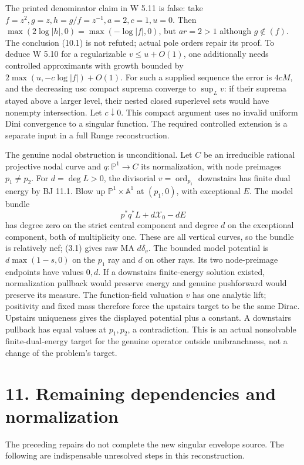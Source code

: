 \documentclass[
  10pt,
]{article}
\begin{document}
The printed denominator claim in W 5.11 is false: take
\(f=z^2,g=z,h=g/f=z^{-1},a=2,c=1,u=0\). Then
\(\max(2\log|h|,0)=\max(-\log|f|,0)\), but \(ar=2>1\) although
\(g\notin(f)\). The conclusion (10.1) is not refuted; actual pole orders
repair its proof. To deduce W 5.10 for a regularizable \(v\le u+O(1)\),
one additionally needs controlled approximants with growth bounded by
\(2\max(u,-c\log|f|)+O(1)\). For such a supplied sequence the error is
\(4cM\), and the decreasing usc compact suprema converge to \(\sup_Lv\):
if their suprema stayed above a larger level, their nested closed
superlevel sets would have nonempty intersection. Let \(c\downarrow0\).
This compact argument uses no invalid uniform Dini convergence to a
singular function. The required controlled extension is a separate input
in a full Runge reconstruction.

The genuine nodal obstruction is unconditional. Let \(C\) be an
irreducible rational projective nodal curve and \(q:\mathbb P^1\to C\)
its normalization, with node preimages \(p_1\ne p_2\). For
\(d=\deg L>0\), the divisorial \(v=\operatorname{ord}_{p_1}\) downstairs
has finite dual energy by BJ 11.1. Blow up
\(\mathbb P^1\times\mathbb A^1\) at \((p_1,0)\), with exceptional \(E\).
The model bundle \[p^*q^*L+d\mathcal X_0-dE\] has degree zero on the
strict central component and degree \(d\) on the exceptional component,
both of multiplicity one. These are all vertical curves, so the bundle
is relatively nef; (3.1) gives raw MA \(d\delta_v\). The bounded model
potential is \(d\max(1-s,0)\) on the \(p_1\) ray and \(d\) on other
rays. Its two node-preimage endpoints have values \(0,d\). If a
downstairs finite-energy solution existed, normalization pullback would
preserve energy and genuine pushforward would preserve its measure. The
function-field valuation \(v\) has one analytic lift; positivity and
fixed mass therefore force the upstairs target to be the same Dirac.
Upstairs uniqueness gives the displayed potential plus a constant. A
downstairs pullback has equal values at \(p_1,p_2\), a contradiction.
This is an actual nonsolvable finite-dual-energy target for the genuine
operator outside unibranchness, not a change of the problem's target.

\section{11. Remaining dependencies and
normalization}\label{remaining-dependencies-and-normalization}

The preceding repairs do not complete the new singular envelope source.
The following are indispensable unresolved steps in this reconstruction.
\end{document}
